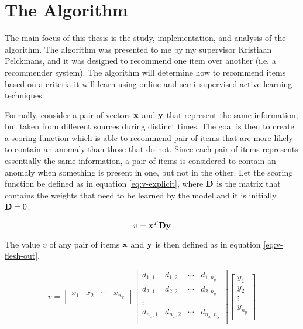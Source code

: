 \section{The \mlblink Algorithm} \label{sect:theory:ml-blink}

The main focus of this thesis is the study, implementation, and analysis of the \mlblink algorithm. The \mlblink algorithm was presented to me by my supervisor Kristiaan Pelckmans, and it was designed to recommend one item over another (i.e. a recommender system). The \mlblink algorithm will determine how to recommend items based on a criteria it will learn using online and semi--supervised active learning techniques.  \newline

Formally, consider a pair of vectors $\boldsymbol{\mathbf{x}}$ and $\boldsymbol{\mathbf{y}}$ that represent the same information, but taken from different sources during distinct times. The goal is then to create a scoring function which is able to recommend pair of items that are more likely to contain an anomaly than those that do not. Since each pair of items represents essentially the same information, a pair of items is considered to contain an anomaly when something is present in one, but not in the other. Let the scoring function be defined as in equation \ref{eq:v-explicit}, where $\boldsymbol{\mathbf{D}}$ is the matrix that contains the weights that need to be learned by the model and it is initially $\boldsymbol{\mathbf{D}} = 0$.

\begin{equation} \label{eq:v-explicit}
  v = \boldsymbol{\mathbf{x}}^T \boldsymbol{\mathbf{D}} \boldsymbol{\mathbf{y}}  
\end{equation}

The value $v$ of any pair of items $\boldsymbol{\mathbf{x}}$ and $\boldsymbol{\mathbf{y}}$ is then defined as in equation \ref{eq:v-flesh-out}.

\begin{equation} \label{eq:v-flesh-out}
    v = 
    \begin{bmatrix}
        x_{1} & x_{2} & \cdots & x_{n_x} \\
    \end{bmatrix}
    \begin{bmatrix}
        d_{1,1} & d_{1,2} & \cdots & d_{1,n_y} \\
        d_{2,1} & d_{2,2} & \cdots & d_{2,n_y} \\
        \vdots \\
        d_{n_x,1} & d_{n_x,2} & \cdots & d_{n_x,n_y} \\
    \end{bmatrix}
    \begin{bmatrix}
        y_{1} \\
        y_{2} \\
        \vdots  \\
        y_{n_y} \\
    \end{bmatrix}
\end{equation}



